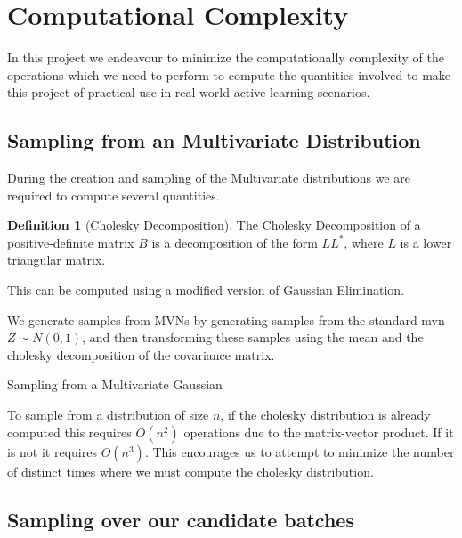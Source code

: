 \documentclass[12pt, a4paper]{report}
\theoremstyle{definition}
\theoremstyle{definition}
\newtheorem{definition}{Definition}[section]
\theoremstyle{definition}
\begin{document}
\section{Computational Complexity}
\label{sec:Computation}
In this project we endeavour to minimize the computationally complexity of the operations which we need to perform to compute the quantities involved to make this project of practical use in real world active learning scenarios.


\subsection{Sampling from an Multivariate Distribution}

During the creation and sampling of the Multivariate distributions we are required to compute several quantities.

\begin{definition}[Cholesky Decomposition]
    The Cholesky Decomposition of a positive-definite matrix $B$ is a decomposition of the form $LL^*$, where $L$ is a lower triangular matrix.
\end{definition}

This can be computed using a modified version of Gaussian Elimination.

We generate samples from MVNs by generating samples from the standard mvn $Z \sim N\left(0, 1\right)$, and then transforming these samples using the mean and the cholesky decomposition of the covariance matrix.

\begin{algorithm}[H]
    \SetAlgoLined
    \caption{Sampling from a Multivariate Gaussian}
\end{algorithm}

To sample from a distribution of size $n$, if the cholesky distribution is already computed this requires $O(n^2)$ operations due to the matrix-vector product. If it is not it requires $O(n^3)$. This encourages us to attempt to minimize the number of distinct times where we must compute the cholesky distribution.


\subsection{Sampling over our candidate batches}
\end{document}
